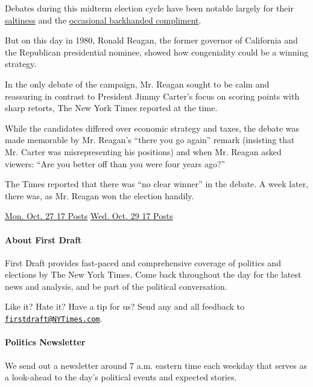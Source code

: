 Debates during this midterm election cycle have been notable largely for
their
\href{//www.nytimes3xbfgragh.onion/politics/first-draft/2014/10/16/?entry=mb-3}{saltiness}
and the
\href{//www.nytimes3xbfgragh.onion/politics/first-draft/2014/10/23/?entry=3311\&_php=true\&_type=blogs\&ref=politics}{occasional
backhanded compliment}.

But on this day in 1980, Ronald Reagan, the former governor of
California and the Republican presidential nominee, showed how
congeniality could be a winning strategy.

In the only debate of the campaign, Mr. Reagan sought to be calm and
reassuring in contrast to President Jimmy Carter's focus on scoring
points with sharp retorts, The New York Times reported at the time.

While the candidates differed over economic strategy and taxes, the
debate was made memorable by Mr. Reagan's ``there you go again'' remark
(insisting that Mr. Carter was misrepresenting his positions) and when
Mr. Reagan asked viewers: ``Are you better off than you were four years
ago?''

The Times reported that there was ``no clear winner'' in the debate. A
week later, there was, as Mr. Reagan won the election handily.


\href{//www.nytimes3xbfgragh.onion/politics/first-draft/2014/10/27/}{Mon.
Oct. 27 17 Posts}
\href{//www.nytimes3xbfgragh.onion/politics/first-draft/2014/10/29/}{Wed.
Oct. 29 17 Posts}

\hypertarget{about-first-draft}{%
\paragraph{About First Draft}\label{about-first-draft}}

First Draft provides fast-paced and comprehensive coverage of politics
and elections by The New York Times. Come back throughout the day for
the latest news and analysis, and be part of the political conversation.

Like it? Hate it? Have a tip for us? Send any and all feedback to
\href{mailto:firstdraft@NYTimes.com}{\nolinkurl{firstdraft@NYTimes.com}}.

\hypertarget{politics-newsletter}{%
\paragraph{Politics Newsletter}\label{politics-newsletter}}

We send out a newsletter around 7 a.m. eastern time each weekday that
serves as a look-ahead to the day's political events and expected
stories.

